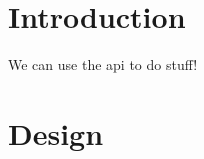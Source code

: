 \documentclass{../../uit-thesis}
\begin{document}
\frontmatter

\tableofcontents


\printglossaries
{}

\mainmatter

\chapter{Introduction}
\lipsum[1-4]

We can use the \ac{api} to do stuff!

\chapter{Design}
\lipsum[5-8]
\end{document}
